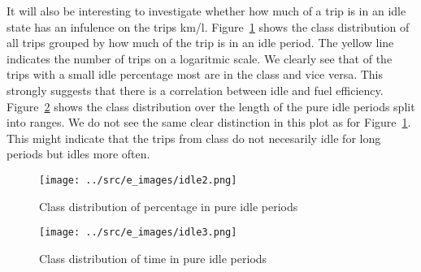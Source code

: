 
It will also be interesting to investigate whether how much of a trip is in an idle state has an infulence on the trips km/l.
Figure~\ref{fig:idleClassPercent} shows the class distribution of all trips grouped by how much of the trip is in an idle period.
The yellow line indicates the number of trips on a logaritmic scale.
We clearly see that of the trips with a small idle percentage most are in the class \fuelHigh and vice versa.
This strongly suggests that there is a correlation between idle and fuel efficiency.
Figure~\ref{fig:idleClassTime} shows the class distribution over the length of the pure idle periods split into ranges.
We do not see the same clear distinction in this plot as for Figure~\ref{fig:idleClassPercent}.
This might indicate that the trips from class \fuelLow do not necesarily idle for long periods but idles more often. 
\begin{figure}[htb]
\centering
\texttt{[image: ../src/e\_images/idle2.png]}
\caption{Class distribution of percentage in pure idle periods}
\label{fig:idleClassPercent}
\end{figure}
\begin{figure}[htb]
\centering
\texttt{[image: ../src/e\_images/idle3.png]}
\caption{Class distribution of time in pure idle periods}
\label{fig:idleClassTime}
\end{figure}

